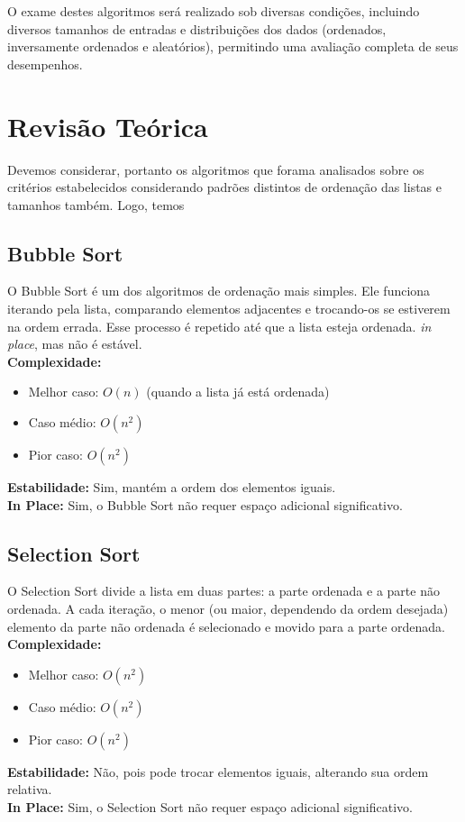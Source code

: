 \documentclass[tcc1,project]{uftex}
\begin{document}
O exame destes algoritmos será realizado sob diversas condições, incluindo diversos tamanhos de entradas e distribuições dos dados (ordenados, inversamente ordenados e aleatórios), permitindo uma avaliação completa de seus desempenhos. 

\chapter{Revisão Teórica}
Devemos considerar, portanto os algoritmos que forama analisados sobre os critérios estabelecidos considerando padrões distintos de ordenação das listas e tamanhos também. Logo, temos 
\section{Bubble Sort}
O Bubble Sort é um dos algoritmos de ordenação mais simples. Ele funciona iterando pela lista, comparando elementos adjacentes e trocando-os se estiverem na ordem errada. Esse processo é repetido até que a lista esteja ordenada. \textit{in place}, mas não é estável. \\
\textbf{Complexidade:}
\begin{itemize}
    \item Melhor caso: $O(n)$ (quando a lista já está ordenada)
    \item Caso médio: $O(n^2)$
    \item Pior caso: $O(n^2)$
    
\end{itemize}
\textbf{Estabilidade:} Sim, mantém a ordem dos elementos iguais. \\
\textbf{In Place:} Sim, o Bubble Sort não requer espaço adicional significativo. \\

\section{Selection Sort}
O Selection Sort divide a lista em duas partes: a parte ordenada e a parte não ordenada. A cada iteração, o menor (ou maior, dependendo da ordem desejada) elemento da parte não ordenada é selecionado e movido para a parte ordenada. \\
\textbf{Complexidade:}
\begin{itemize}
    \item Melhor caso: $O(n^2)$
    \item Caso médio: $O(n^2)$
    \item Pior caso: $O(n^2)$
    
    
\end{itemize}
\textbf{Estabilidade:} Não, pois pode trocar elementos iguais, alterando sua ordem relativa. \\
\textbf{In Place:} Sim, o Selection Sort não requer espaço adicional significativo. \\
\end{document}
